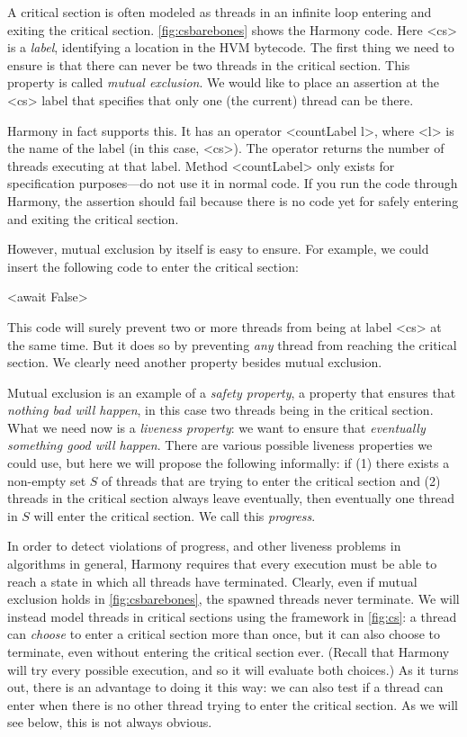 \documentclass{report}
\newenvironment{code}{
\tcolorbox
}{
\endtcolorbox
}
\begin{document}
%

A critical section is often modeled as threads in an infinite loop
entering and exiting the critical section.
\autoref{fig:csbarebones} shows the Harmony code.
Here <{cs}> is a \emph{label},
%
identifying a location in the HVM bytecode.  The first thing we need to
ensure is that there can never be two threads in the critical section.
This property is called \emph{mutual exclusion}.
%
We would like to place an assertion at the <{cs}> label that
specifies that only one (the current) thread can be there.

Harmony in fact supports this.
It has an operator <{countLabel l}>,
%
where <{l}> is the name of the label (in this case, <{cs}>).
The operator returns the number of threads executing at that label.
Method <{countLabel}> only exists for specification purposes---do not
use it in normal code.
If you run the code through Harmony, the assertion should fail because
there is no code yet for safely entering and exiting the critical section.

However, mutual exclusion by itself is easy to ensure.
For example, we could insert the following code to enter the
critical section:
\begin{code}
<{await False}>
\end{code}
This code will surely prevent two or more threads from being
at label <{cs}> at the same time.
But it does so by preventing \emph{any} thread from reaching
the critical section.
We clearly need another property besides mutual exclusion.

Mutual exclusion is an example of a \emph{safety property},
%
a property that ensures that \emph{nothing bad will happen}, in this case
two threads being in the critical section.
What we need now is a \emph{liveness property}:
%
we want to ensure that
\emph{eventually something good will happen}.
There are various possible liveness properties we could use,
but here we will propose the following informally: if
(1) there exists a non-empty
set $S$ of threads that are trying to enter the critical section and
(2) threads in the critical section always leave eventually, then
eventually one thread in $S$ will enter the critical section.
We call this \emph{progress}.
%

In order to detect violations of progress, and other liveness problems in
algorithms in general, Harmony requires that every execution must be
able to reach a state in which all threads have terminated.
Clearly, even if mutual exclusion holds in \autoref{fig:csbarebones},
the spawned threads never terminate.  We
will instead model threads in critical sections using the framework in
\autoref{fig:cs}: a thread can \emph{choose} to enter a
critical section more than once, but it can also choose to terminate, even
without entering the critical section ever.
(Recall that Harmony will try every possible execution, and so it will evaluate
both choices.)
As it turns out, there is an advantage to doing it this way: we can also
test if a thread can enter when there is no other thread trying to enter
the critical section.  As we will see below, this is not always obvious.
\end{document}
